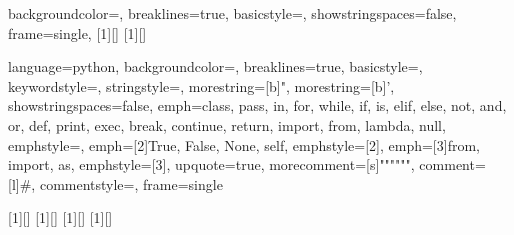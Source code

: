  {%
backgroundcolor=\color[gray]{0.9},
breaklines=true,
basicstyle=\ttfamily\small,
showstringspaces=false,
frame=single,
}
\newcommand{\imatlab}[1]{\lstset{language=fooMatlab,basicstyle=\color[gray]{0.6}}\lstinline|#1|}
[1][]{}{} 
[1][]{\lstset{language=fooMatlab,#1}}{} 
\newcommand{\matinput}[1]{\lstset{language=fooMatlab}}

 {%
language=python,
backgroundcolor=\color[gray]{0.7},
breaklines=true,
basicstyle=\ttfamily\small,
keywordstyle=\color{blue},
stringstyle=\color{darkgreen},
morestring=[b]",%
morestring=[b]',%
showstringspaces=false,
emph={class, pass, in, for, while, if, is, elif, else, not, and, or,
def, print, exec, break, continue, return, import, from, lambda, null},
emphstyle=\color{blue},
emph={[2]True, False, None, self},
emphstyle=[2]\color{key},
emph={[3]from, import, as},
emphstyle=[3]\color{blue},
upquote=true,
morecomment=[s]{"""}{"""},
comment=[l]{\#},
commentstyle=\color{gray},
frame=single
}

\newcommand{\pyinput}[1]{\lstset{language=fooPython}}
\newcommand{\isage}[1]{{\lstset{language=fooPython,basicstyle=\color[gray]{0.3}}\lstinline|#1|}}

[1][]{}{}
[1][]{\lstset{language=fooPython,#1}}{}
[1][]{}{}
[1][]{\lstset{language=fooPython,#1}}{}

